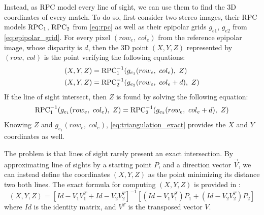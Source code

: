 Instead, as RPC model every line of sight, we can use them to find the 3D coordinates of every match. To do so, first consider two stereo images, their RPC models $\mathrm{RPC}_1$, $\mathrm{RPC}_2$ from \cref{eq:rpc} as well as their epipolar grids $g_{e1}$, $g_{e2}$ from \cref{eq:epipolar_grid}. For every pixel $(row_e, ~col_e)$ from the reference epipolar image, whose disparity is $d$, then the 3D point $(X, Y, Z)$ represented by $(row, ~col)$ is the point verifying the following equations:
\begin{align}
    (X, Y, Z) &= \mathrm{RPC}^{-1}_1(g_{e_1}(row_e,~col_e),~Z)\label{eq:triangulation_exact}\\
    (X, Y, Z) &= \mathrm{RPC}^{-1}_2(g_{e_2}(row_e,~col_e+d),~Z) 
\end{align}
If the line of sight intersect, then $Z$ is found by solving the following equation:
\begin{equation}
     \mathrm{RPC}^{-1}_1(g_{e_1}(row_e,~col_e),~Z) = \mathrm{RPC}^{-1}_2(g_{e_2}(row_e,~col_e+d),~Z) 
\end{equation}
Knowing $Z$ and $g_{e_1}(row_e,~col_e)$, \cref{eq:triangulation_exact} provides the $X$ and $Y$ coordinates as well.

The problem is that lines of sight rarely present an exact intersection. By approximating line of sights by a starting point $P$, and a direction vector $\overrightarrow{V}$, we can instead define the coordinates $(X,Y,Z)$ as the point minimizing its distance two both lines. The exact formula for computing $(X,Y,Z)$ is provided in \cite{delvit_geometric_2006}:
\begin{equation}
    (X,Y,Z) = \left[ Id - V_1V_1^T + Id - V_2V_2^T \right]^{-1} \left[ (Id - V_1V_1^T)P_1 + (Id - V_2V_2^T)P_2 \right]
\end{equation}
where $Id$ is the identity matrix, and $V^T$ is the transposed vector $V$.

